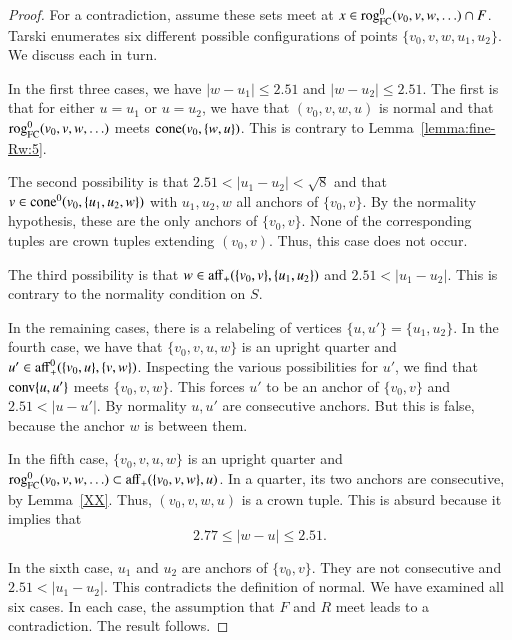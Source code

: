 \begin{proof}
For a contradiction, assume these sets meet at $x\in {\operatorname{rog}}^0_{\text{FC}}(v_0,v,w,\ldots)\cap F$.
Tarski enumerates six different possible
configurations of points $\{v_0,v,w,u_1,u_2\}$.  We discuss each
in turn.

In the first three cases, 
%
we have $|w-u_1|\le 2.51$ and $|w-u_2|\le 2.51$.  The first is that
for either $u=u_1$ or $u=u_2$, we have that $(v_0,v,w,u)$ is normal
and that ${\operatorname{rog}}^0_{\text{FC}}(v_0,v,w,\ldots)$ meets ${\operatorname{cone}}(v_0,\{w,u\})$.  This is contrary to
Lemma~\ref{lemma:fine-Rw:5}.

The second possibility is that
$2.51<|u_1-u_2|<\sqrt8$ and that $v\in{\operatorname{cone}}^0(v_0,\{u_1,u_2,w\})$
with $u_1,u_2,w$ all anchors of $\{v_0,v\}$.  By the normality
hypothesis, these are the only anchors of $\{v_0,v\}$.  None of the
corresponding tuples are crown tuples extending
$(v_0,v)$.  Thus, this case does not
occur. 

The third possibility is that $w\in {\operatorname{aff}}_+(\{v_0,v\},\{u_1,u_2\})$
and $2.51<|u_1-u_2|$.  This is contrary to the normality
condition on $S$.

In the remaining cases, there is a 
relabeling of vertices $\{u,u'\}=\{u_1,u_2\}$.
In the fourth case, we have that $\{v_0,v,u,w\}$ is an upright
quarter and $u'\in {\operatorname{aff}}_+^0(\{v_0,u\},\{v,w\})$.  Inspecting
the various possibilities for $u'$, we find that
${\operatorname{conv}}\{u,u'\}$ meets $\{v_0,v,w\}$.  This forces $u'$ to be
an anchor of $\{v_0,v\}$ and $2.51 < |u-u'|$.  By normality
$u,u'$ are consecutive anchors.  But this is false, because the
anchor  $w$ is between them.

In the fifth case, $\{v_0,v,u,w\}$ is an upright quarter and
${\operatorname{rog}}^0_{\text{FC}}(v_0,v,w,\ldots)\subset {\operatorname{aff}}_+(\{v_0,v,w\},u)$.  
In a quarter, its two anchors are consecutive, by Lemma~\ref{XX}.  Thus,
$(v_0,v,w,u)$ is a crown tuple.  This is absurd because it implies that
  $$
   2.77 \le |w-u| \le 2.51.
  $$

In the sixth case, $u_1$ and $u_2$ are anchors of $\{v_0,v\}$.
They are not consecutive and $2.51 < |u_1-u_2|$.  This contradicts
the definition of normal.
We have examined all six cases.  In each case, the assumption
that $F$ and $R$ meet leads to a contradiction.  The result follows.
\end{proof}

